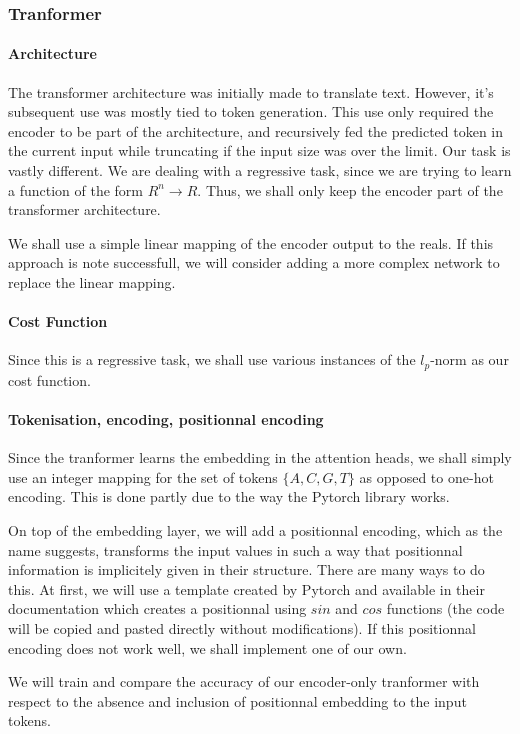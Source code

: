 \documentclass{article}
\begin{document}
\subsubsection{Tranformer}
\paragraph{Architecture}
The transformer architecture was initially made to translate text.
However, it's subsequent use was mostly tied to token generation. 
This use only required the encoder to be part of the architecture, 
and recursively fed the predicted token in the current input while 
truncating if the input size was over the limit.
Our task is vastly different. We are dealing with a regressive task,
since we are trying to learn a function of the form $R^n \to R$.
Thus, we shall only keep the encoder part of the transformer architecture. 

We shall use a simple linear mapping of the encoder output to the reals.
If this approach is note successfull, we will consider adding a more complex
network to replace the linear mapping.
\paragraph{Cost Function}
Since this is a regressive task, we shall use various instances of the 
$l_p$-norm as our cost function.

\paragraph{Tokenisation, encoding, positionnal encoding}
Since the tranformer learns the embedding in the attention heads\cite{transformers}, 
we shall simply use an integer mapping for the set of tokens $\{A,C,G,T\}$ as opposed to 
one-hot encoding. This is done partly due to the way the Pytorch library works.

On top of the embedding layer, we will add a positionnal encoding, which as the
name suggests, transforms the input values in such a way that positionnal information 
is implicitely given in their structure. There are many ways to do this. At first, we will use 
a template created by Pytorch and available in their documentation which creates
a positionnal using $sin$ and $cos$ functions (the code will be copied and 
pasted directly without modifications). If this positionnal encoding does not
work well, we shall implement one of our own.

We will train and compare the accuracy of our encoder-only tranformer with 
respect to the absence and inclusion of positionnal embedding to the input tokens.
\end{document}
